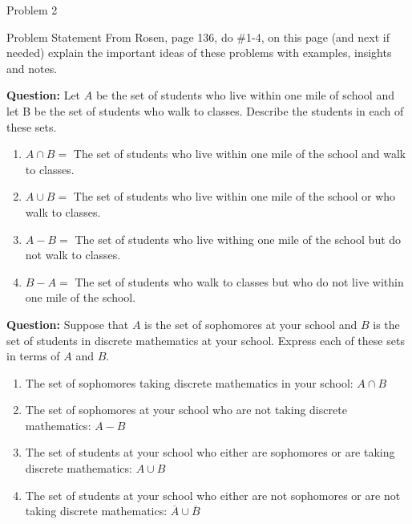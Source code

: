\begin{problem}{Problem 2}
    \begin{statement}{Problem Statement}
        From Rosen, page 136, do \#1-4, on this page (and next if needed) explain the important ideas of these problems with examples, insights and notes.
    \end{statement}

    \begin{highlight}[Solution - \#1]
        \noindent \textbf{Question:} Let $A$ be the set of students who live within one mile of school and let B be the set of students who walk to classes. Describe the students in each of these sets.
        
        \begin{enumerate}[label=(\alph*)]
            \item $A \cap B =$ The set of students who live within one mile of the school and walk to classes. 
            \item $A \cup B =$ The set of students who live within one mile of the school or who walk to classes.
            \item $A - B =$ The set of students who live withing one mile of the school but do not walk to classes.
            \item $B - A =$ The set of students who walk to classes but who do not live within one mile of the school.
        \end{enumerate}
    \end{highlight}

    \begin{highlight}[Solution - \#2]
        \noindent \textbf{Question:} Suppose that $A$ is the set of sophomores at your school and $B$ is the set of students in discrete mathematics at your school. Express each of these sets in terms 
        of $A$ and $B$.

        \begin{enumerate}[label=(\alph*)]
            \item The set of sophomores taking discrete mathematics in your school: $A \cap B$
            \item The set of sophomores at your school who are not taking discrete mathematics: $A - B$
            \item The set of students at your school who either are sophomores or are taking discrete mathematics: $A \cup B$
            \item The set of students at your school who either are not sophomores or are not taking discrete mathematics: $\overline{A} \cup \overline{B}$
        \end{enumerate}
    \end{highlight}


\end{problem}
